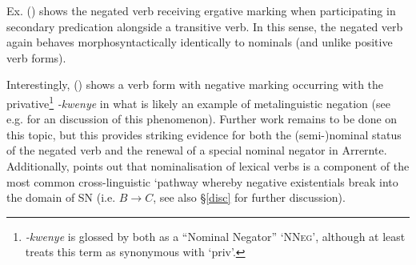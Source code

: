 Ex. () shows the negated verb receiving ergative marking when participating in secondary predication alongside a transitive verb. In this sense, the negated verb again behaves morphosyntactically identically to nominals (and unlike positive verb forms).

Interestingly, () shows a verb form with negative marking occurring with the privative\footnote{\textit{-kwenye} is glossed by both \citealt{Henderson2013,Wilkins1989} as a ``Nominal Negator'' `\textsc{NNeg}', although at least \citealt[158]{Wilkins1989} treats this term as synonymous with `\gls{priv}'.} \textit{-kwenye} in what is likely an example of metalinguistic negation (see e.g. \citealt[19]{Horn2017} for an discussion of this phenomenon). Further work remains to be done on this topic, but this provides striking evidence for both the (semi-)nominal status of the negated verb and the renewal of a special nominal negator in Arrernte. Additionally, \citet[171]{Veselinova2016} points out that nominalisation of lexical verbs is a component of the most common cross-linguistic `pathway whereby negative existentials break into the domain of SN (i.e. $B\to C$, see also §\ref{disc} for further discussion).


